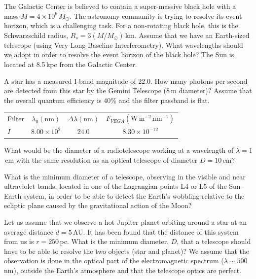 The Galactic Center is believed to contain a super-massive black hole with a
mass $M = 4 \times 10^6\,M_\odot$. The astronomy community is trying to resolve
its event horizon, which is a challenging task. For a non-rotating black hole,
this is the Schwarzschild radius, $R_s = 3(M/M_\odot)$\,km. Assume that we have
an Earth-sized telescope (using Very Long Baseline Interferometry). What
wavelengths should we adopt in order to resolve the event horizon of the black
hole? The Sun is located at 8.5\,kpc from the Galactic Center.

A star has a measured I-band magnitude of 22.0. How many photons per second are
detected from this star by the Gemini Telescope (8\,m diameter)? Assume that
the overall quantum efficiency is 40\% and the filter passband is flat.

\begin{center}
\begin{tabular}{lccc}
Filter & $\lambda_0(\mathrm{nm})$ & $\Delta\lambda(\mathrm{nm})$
  & $F_{VEGA}(\mathrm{W\,m^{-2}\,nm^{-1}})$ \\
$I$ & $8.00 \times 10^2$ & 24.0 & $8.30 \times 10^{-12}$ \\
\end{tabular}
\end{center}

What would be the diameter of a radiotelescope working at a wavelength of
$\lambda = 1$\,cm with the same resolution as an optical telescope of diameter
$D = 10$\,cm?

What is the minimum diameter of a telescope, observing in the visible and near
ultraviolet bands, located in one of the Lagrangian points L4 or L5 of the
Sun--Earth system, in order to be able to detect the Earth's wobbling relative
to the ecliptic plane caused by the gravitational action of the Moon?

Let us assume that we observe a hot Jupiter planet orbiting around a star at an
average distance $d = 5$\,AU. It has been found that the distance of this
system from us is $r = 250$\,pc. What is the minimum diameter, $D$, that a
telescope should have to be able to resolve the two objects (star and planet)?
We assume that the observation is done in the optical part of the
electromagnetic spectrum ($\lambda \sim 500$\,nm), outside the Earth's
atmosphere and that the telescope optics are perfect.

